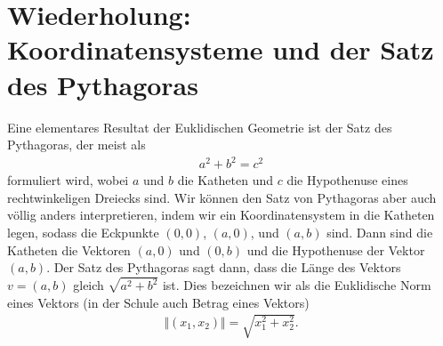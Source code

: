\documentclass[letterpaper,10pt,english]{jupyterBook}
\begin{document}
\section{Wiederholung: Koordinatensysteme und der Satz des Pythagoras}
\label{\detokenize{vorkurs/koord:wiederholung-koordinatensysteme-und-der-satz-des-pythagoras}}\label{\detokenize{vorkurs/koord::doc}}
Eine elementares Resultat der Euklidischen Geometrie ist der Satz des Pythagoras, der meist als
\begin{equation*}
\begin{split} a^2 + b^2 = c^2 \end{split}
\end{equation*}
formuliert wird, wobei \(a\) und \(b\) die Katheten und \(c\) die Hypothenuse eines rechtwinkeligen Dreiecks sind.
Wir können den Satz von Pythagoras aber auch völlig anders interpretieren, indem wir ein Koordinatensystem in die Katheten legen, sodass die Eckpunkte \((0,0)\), \((a,0)\), und \((a,b)\) sind. Dann sind die Katheten die Vektoren \((a,0)\) und \((0,b)\) und die Hypothenuse der Vektor \((a,b)\). Der Satz des Pythagoras sagt dann, dass die Länge des Vektors \(v=(a,b)\) gleich \(\sqrt{a^2+b^2}\) ist. Dies bezeichnen wir als die Euklidische Norm eines Vektors (in der Schule auch Betrag eines Vektors)
\begin{equation*}
\begin{split} \Vert (x_1,x_2) \Vert = \sqrt{x_1^2+x_2^2}. \end{split}
\end{equation*}
\end{document}
